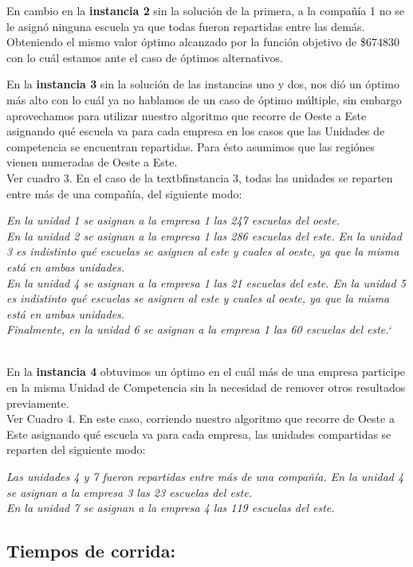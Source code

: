\documentclass[12pt]{article}
\begin{document}
En cambio en la \textbf{instancia 2} sin la solución de la primera, a la compañía 1 no se le asignó ninguna escuela ya que todas fueron repartidas entre las demás. Obteniendo el mismo valor óptimo alcanzado por la función objetivo de \$$674830$ con lo cuál estamos ante el caso de óptimos alternativos.

\bigskip
En la \textbf{instancia 3} sin la solución de las instancias uno y dos, nos dió un óptimo más alto con lo cuál ya no hablamos de un caso de óptimo múltiple, sin embargo aprovechamos para utilizar nuestro algoritmo que recorre de Oeste a Este asignando qué escuela va para cada empresa en los casos que las Unidades de competencia se encuentran repartidas. Para ésto asumimos que las regiónes vienen numeradas de Oeste a Este.
\\Ver cuadro 3.
En el caso de la textbf{instancia 3}, todas las unidades se reparten entre más de una compañía, del siguiente modo:

\textit{En la unidad 1 se asignan a la empresa 1 las 247 escuelas del oeste.\\
En la unidad 2 se asignan a la empresa 1 las 286 escuelas del este. En la unidad 3 es indistinto qué escuelas se asignen al este y cuales al oeste, ya que la misma está en ambas unidades.\\
En la unidad 4 se asignan a la empresa 1 las 21 escuelas del este. En la unidad 5 es indistinto qué escuelas se asignen al este y cuales al oeste, ya que la misma está en ambas unidades.\\
Finalmente, en la unidad 6 se asignan a la empresa 1 las 60 escuelas del este.`}


\\

En la \textbf{instancia 4} obtuvimos un óptimo en el cuál más de una empresa participe en la misma Unidad de Competencia sin la necesidad de remover otros resultados previamente. 
\\Ver Cuadro 4.
En este caso, corriendo nuestro algoritmo que recorre de Oeste a Este asignando qué escuela va para cada empresa, las unidades compartidas se reparten del siguiente modo:

\textit{Las unidades 4 y 7 fueron repartidas entre más de una compañía. En la unidad 4 se asignan a la empresa 3 las 23 escuelas del este.\\
En la unidad 7 se asignan a la empresa 4 las 119 escuelas del este.}
\subsection{Tiempos de corrida:}
\end{document}
